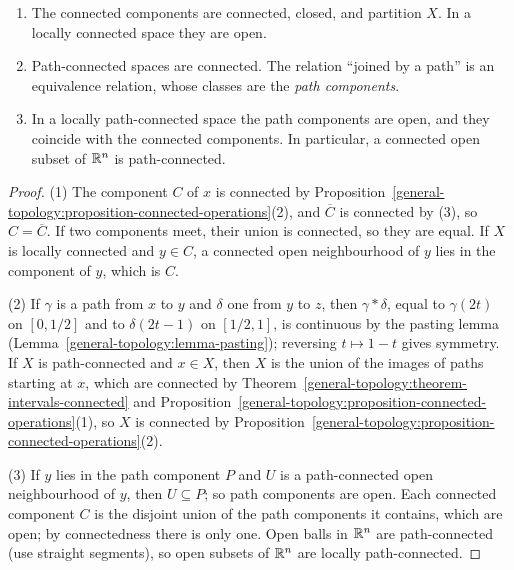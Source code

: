 \begin{proposition}\label{general-topology:proposition-components}
\begin{enumerate}
\item The connected components are connected, closed, and partition $X$. In a locally connected space they are open.
\item Path-connected spaces are connected. The relation ``joined by a path'' is an equivalence relation, whose classes are the \emph{path components}.
\item In a locally path-connected space the path components are open, and they coincide with the connected components. In particular, a connected
open subset of $\mathbb{R}^n$ is path-connected.
\end{enumerate}
\end{proposition}

\begin{proof}
(1) The component $C$ of $x$ is connected by Proposition~\ref{general-topology:proposition-connected-operations}(2), and $\overline{C}$ is connected by
(3), so $C = \overline{C}$. If two components meet, their union is connected, so they are equal. If $X$ is locally connected and $y \in C$, a connected
open neighbourhood of $y$ lies in the component of $y$, which is $C$.

(2) If $\gamma$ is a path from $x$ to $y$ and $\delta$ one from $y$ to $z$, then $\gamma * \delta$, equal to $\gamma(2t)$ on $[0, 1/2]$ and to
$\delta(2t - 1)$ on $[1/2, 1]$, is continuous by the pasting lemma (Lemma~\ref{general-topology:lemma-pasting}); reversing $t \mapsto 1 - t$ gives
symmetry. If $X$ is path-connected and $x \in X$, then $X$ is the union of the images of paths starting at $x$, which are connected by
Theorem~\ref{general-topology:theorem-intervals-connected} and Proposition~\ref{general-topology:proposition-connected-operations}(1), so $X$ is
connected by Proposition~\ref{general-topology:proposition-connected-operations}(2).

(3) If $y$ lies in the path component $P$ and $U$ is a path-connected open neighbourhood of $y$, then $U \subseteq P$; so path components are open. Each
connected component $C$ is the disjoint union of the path components it contains, which are open; by connectedness there is only one. Open balls in
$\mathbb{R}^n$ are path-connected (use straight segments), so open subsets of $\mathbb{R}^n$ are locally path-connected.
\end{proof}

